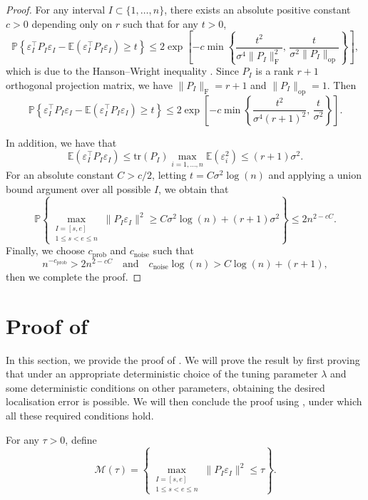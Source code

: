 \documentclass{article}
\begin{document}
\begin{proof}
For any interval $I \subset \{1, \ldots, n\}$, there exists an absolute positive constant $c > 0$ depending only on $r$ such that for any $t > 0$,
	\[
		\mathbb{P}\left\{\varepsilon_I^{\top} P_I \varepsilon_I - \mathbb{E}\left(\varepsilon_I^{\top} P_I \varepsilon_I\right) \geq t\right\} \leq 2 \exp\left[-c \min\left\{\frac{t^2}{\sigma^4 \|P_I\|_{\mathrm{F}}^2}, \, \frac{t}{\sigma^2 \|P_I\|_{\mathrm{op}}}\right\}\right],
	\]
	which is due to the Hanson--Wright inequality \citep[e.g.~Theorem~1.1 in][]{rudelson2013hanson}.  Since $P_I$ is a rank $r + 1$ orthogonal projection matrix, we have $\|P_I\|_{\mathrm{F}} = r + 1$ and $\|P_I\|_{\mathrm{op}} = 1$.  Then
	\[
		\mathbb{P}\left\{\varepsilon_I^{\top} P_I \varepsilon_I - \mathbb{E}\left(\varepsilon_I^{\top} P_I \varepsilon_I\right) \geq t\right\} \leq 2 \exp\left[-c \min\left\{\frac{t^2}{\sigma^4 (r+1)^2}, \, \frac{t}{\sigma^2}\right\}\right].
	\]
	
In addition, we have that 
	\[
		\mathbb{E}\left(\varepsilon_I^{\top}P_I\varepsilon_I\right) \leq \mathrm{tr}(P_I) \max_{i = 1, \ldots, n} \mathbb{E}(\varepsilon_i^2) \leq (r + 1)\sigma^2.
	\] 
	For an absolute constant $C > c/2$, letting $t = C\sigma^2 \log(n)$ and applying a union bound argument over all possible $I$, we obtain that
	\[
		\mathbb{P}\left\{\max_{\substack{I = [s, e] \\ 1 \leq s < e \leq n}} \|P_I \varepsilon_I\|^2 \geq C\sigma^2 \log(n) + (r+1)\sigma^2 \right\} \leq 2 n^{2-cC}.
	\]
	Finally, we choose $c_{\mathrm{prob}}$ and $c_{\mathrm{noise}}$ such that
	\[
		n^{-c_{\mathrm{prob}}} > 2n^{2-cC} \quad \mbox{and} \quad c_{\mathrm{noise}} \log(n) > C\log(n) + (r+1),
	\]
	then we complete the proof.
\end{proof}


\section{Proof of }\label{sec-proofs-main}

In this section, we provide the proof of .  We will prove the result by first proving that under an appropriate deterministic choice of the tuning parameter $\lambda$ and some deterministic conditions on other parameters, obtaining the desired localisation error is possible.  We will then conclude the proof using , under which all these required conditions hold.  

For any $\tau > 0$, define
	\begin{equation}\label{eq-def-G-event}
		\mathcal{M}(\tau) = \left\{\max_{\substack{I = [s, e] \\ 1 \leq s < e \leq n}} \|P_I \varepsilon_I\|^2 \leq \tau \right\}.
	\end{equation}
\end{document}
